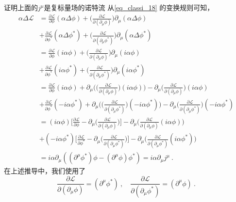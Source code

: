 \begin{exercise}{证明上面的$j^\mu$是复标量场的诺特流}
从\autoref{eq_classi_18} 的变换规则可知，
\begin{align}\nonumber
\alpha \Delta \mathcal L & = \frac{\partial \mathcal L}{\partial\phi} (\alpha \Delta \phi) +\bigg( \frac{\partial \mathcal L}{\partial(\partial_\mu\phi)} \bigg) \partial_\mu(\alpha\Delta\phi) \\\nonumber
&+\frac{\partial \mathcal L}{\partial\phi^*} (\alpha \Delta \phi^*) +\bigg( \frac{\partial \mathcal L}{\partial(\partial_\mu\phi^*)} \bigg) \partial_\mu(\alpha\Delta\phi^*) \\\nonumber
& = \frac{\partial \mathcal L}{\partial\phi} ( i \alpha \phi) +\bigg( \frac{\partial \mathcal L}{\partial(\partial_\mu\phi)} \bigg) \partial_\mu(i \alpha \phi) \\\nonumber
& +\frac{\partial \mathcal L}{\partial\phi^*} (i \alpha \phi^*) +\bigg( \frac{\partial \mathcal L}{\partial(\partial_\mu\phi^*)} \bigg) \partial_\mu(i \alpha \phi^*) \\\nonumber
& = \frac{\partial \mathcal L}{\partial\phi} ( i \alpha \phi) +\partial_\mu \bigg(\bigg( \frac{\partial \mathcal L}{\partial(\partial_\mu\phi)} \bigg) (i \alpha \phi)\bigg) -\partial_\mu\bigg( \frac{\partial \mathcal L}{\partial(\partial_\mu\phi)} \bigg)(i\alpha\phi) \\\nonumber
& +\frac{\partial \mathcal L}{\partial\phi^*} (-i \alpha \phi^*) + \partial_\mu\bigg(\bigg( \frac{\partial \mathcal L}{\partial(\partial_\mu\phi^*)} \bigg) (-i \alpha \phi^*) \bigg) -\partial_\mu\bigg( \frac{\partial \mathcal L}{\partial(\partial_\mu\phi^*)} \bigg)(-i\alpha\phi^*) \\\nonumber
& = (i\alpha\phi) \bigg[ \frac{\partial \mathcal L}{\partial\phi} - \partial_\mu\bigg(\frac{\partial \mathcal L}{\partial(\partial_\mu\phi)}\bigg) \bigg] - \partial_\mu \bigg( \frac{\partial \mathcal L}{\partial(\partial_\mu\phi)} (i\alpha\phi) \bigg)\\\nonumber
& +(-i\alpha\phi^*) \bigg[ \frac{\partial \mathcal L}{\partial\phi^*} - \partial_\mu\bigg(\frac{\partial \mathcal L}{\partial(\partial_\mu\phi^*)}\bigg) \bigg] - \partial_\mu \bigg( \frac{\partial \mathcal L}{\partial(\partial_\mu\phi^*)} (i\alpha\phi^*) \bigg)\\
&= i \alpha \partial_\mu ((\partial^\mu\phi^*)\phi-(\partial^\mu\phi)\phi^*) = i \alpha \partial_\mu j^\mu~.
\end{align}
在上述推导中，我们使用了
\begin{equation}
\frac{\partial\mathcal L}{\partial(\partial_\mu\phi)}= (\partial^\mu\phi^*)~,\quad
\frac{\partial\mathcal L}{\partial(\partial_\mu\phi^*)}= (\partial^\mu\phi)~.
\end{equation}
\end{exercise}
